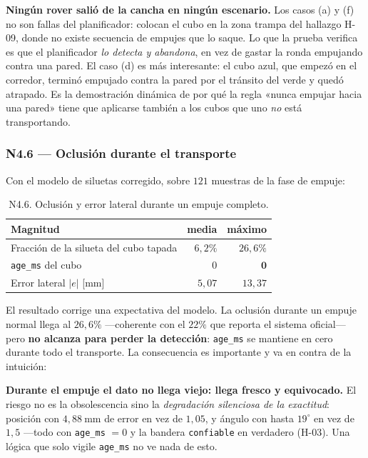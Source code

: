 \documentclass[11pt,a4paper]{article}
\newcommand{\grados}{^{\circ}}
\begin{document}
\textbf{Ningún rover salió de la cancha en ningún escenario.} Los casos (a) y (f) no son
fallas del planificador: colocan el cubo en la zona trampa del hallazgo H-09, donde no
existe secuencia de empujes que lo saque. Lo que la prueba verifica es que el
planificador \emph{lo detecta y abandona}, en vez de gastar la ronda empujando contra
una pared. El caso (d) es más interesante: el cubo azul, que empezó en el corredor,
terminó empujado contra la pared por el tránsito del verde y quedó atrapado. Es la
demostración dinámica de por qué la regla «nunca empujar hacia una pared» tiene que
aplicarse también a los cubos que uno \emph{no} está transportando.

\subsubsection{N4.6 --- Oclusión durante el transporte}

Con el modelo de siluetas corregido, sobre $121$ muestras de la fase de empuje:

\begin{table}[htbp]
\centering
\small
\caption{N4.6. Oclusión y error lateral durante un empuje completo.}
\begin{tabular}{lrr}
\toprule
Magnitud & media & máximo \\
\midrule
Fracción de la silueta del cubo tapada & $6{,}2\%$ & $26{,}6\%$ \\
\texttt{age\_ms} del cubo & $0$ & $\mathbf{0}$ \\
Error lateral $|e|$ [mm] & $5{,}07$ & $13{,}37$ \\
\bottomrule
\end{tabular}
\end{table}

El resultado corrige una expectativa del modelo. La oclusión durante un empuje normal
llega al $26{,}6\%$ ---coherente con el $22\%$ que reporta el sistema oficial--- pero
\textbf{no alcanza para perder la detección}: \texttt{age\_ms} se mantiene en cero
durante todo el transporte. La consecuencia es importante y va en contra de la
intuición:

\begin{tcolorbox}[colback=black!3,colframe=black!50,boxrule=0.5pt,arc=1pt]
\textbf{Durante el empuje el dato no llega viejo: llega fresco y equivocado.} El riesgo
no es la obsolescencia sino la \emph{degradación silenciosa de la exactitud}: posición
con $4{,}88\ \mathrm{mm}$ de error en vez de $1{,}05$, y ángulo con hasta $19\grados$ en
vez de $1{,}5$ ---todo con \texttt{age\_ms} $=0$ y la bandera \texttt{confiable} en
verdadero (H-03). Una lógica que solo vigile \texttt{age\_ms} no ve nada de esto.
\end{tcolorbox}
\end{document}
